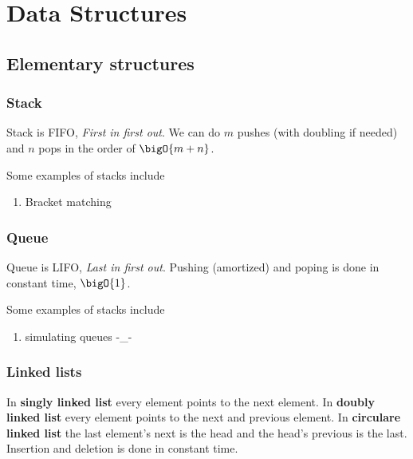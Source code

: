 \chapter{Data Structures}
\section{Elementary structures}
\subsection{Stack}
Stack is FIFO, \textit{First in first out}. We can do \(m\) pushes (with doubling if needed) and \(n\) pops in the order of \(\bigO{m + n}\).
\begin{example}
    Some examples of stacks include
    \begin{enumerate}
        \item Bracket matching
    \end{enumerate}
\end{example}

\subsection{Queue}
Queue is LIFO, \textit{Last in first out}.
Pushing (amortized) and poping is done in constant time, \(\bigO{1}\).
\begin{example}
    Some examples of stacks include
    \begin{enumerate}
        \item simulating queues -\_-
    \end{enumerate}
\end{example}

\subsection{Linked lists}
In \textbf{singly linked list} every element points to the next element. In \textbf{doubly linked list} every element points to the next and previous element. In \textbf{circulare linked list} the last element's next is the head and the head's previous is the last. Insertion and deletion is done in constant time.
